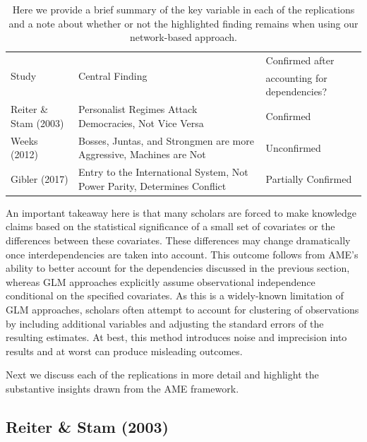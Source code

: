 \begin{table}[ht]
\centering
\caption{Here we provide a brief summary of the key variable in each of the replications and a note about whether or not the highlighted finding remains when using our network-based approach.}
	\begin{tabular}{l p{6cm} l} \toprule
		\multirow{2}{*}{Study} & \multirow{2}{*}{Central Finding} &  Confirmed after \\
		& &  accounting for dependencies? \\ \toprule
		Reiter \& Stam (2003) & Personalist Regimes Attack Democracies, Not Vice Versa & {Confirmed} \\ \midrule
		Weeks (2012) & Bosses, Juntas, and Strongmen are more Aggressive, Machines are Not & {Unconfirmed} \\\midrule
		Gibler (2017) & Entry to the International System, Not Power Parity, Determines Conflict & {Partially Confirmed}\\ \bottomrule
	\end{tabular}
	\label{tab:modelFindingSumm}
\end{table}

An important takeaway here is that many scholars are forced to make knowledge claims based on the statistical significance of a small set of covariates or the differences between these covariates. These differences may change dramatically once interdependencies are taken into account. This outcome follows from AME's ability to better account for the dependencies discussed in the previous section, whereas GLM approaches explicitly assume observational independence conditional on the specified covariates. As this is a widely-known limitation of GLM approaches, scholars often attempt to account for clustering of observations by including additional variables and adjusting the standard errors of the resulting estimates. At best, this method introduces noise and imprecision into results and at worst can produce misleading outcomes.

Next we discuss each of the replications in more detail and highlight the substantive insights drawn from the AME framework.

\subsection{Reiter \& Stam (2003)}

